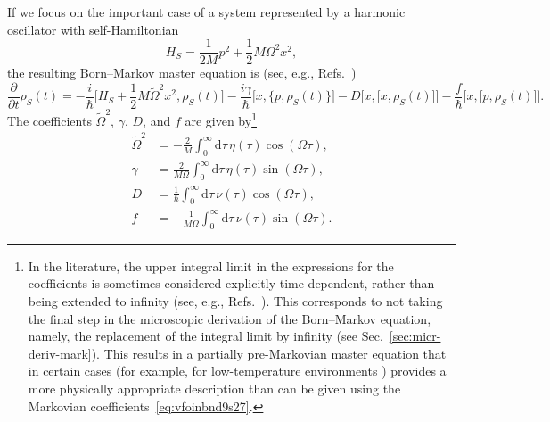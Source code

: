 \documentclass[3p,sort&compress]{elsarticle}
\newcommand{\D}{\ensuremath{\mathrm{d}}}
\newcommand{\I}{\ensuremath{i}}
\newcommand{\op}[1]{#1}
\begin{document}
If we focus on the important case of a system represented by a harmonic oscillator with self-Hamiltonian
%
\begin{equation}
  \label{eq:sfsfsdfy7jaa11}
  \op{H}_S =  \frac{1}{2M}p^2 +
  \frac{1}{2}M\Omega^2x^2,
\end{equation}
%
the resulting Born--Markov master equation is (see, e.g., Refs.~\cite{Breuer:2002:oq,Zurek:2002:ii,Schlosshauer:2007:un})
%
\begin{equation}
\label{eq:vfoinbnd9s27}
  \frac{\partial}{\partial t} \op{\rho}_S(t) 
  = -\frac{\I}{\hbar} \bigl[ \op{H}_S + \frac{1}{2}M
    \widetilde{\Omega}^2 x^2, \op{\rho}_S(t) \bigr]
  - \frac{\I \gamma}{\hbar} \bigl[ x, \bigr\{ p,
      \op{\rho}_S(t) \bigr\} \bigr] 
 - D \bigl[ x, \bigl[ x, \op{\rho}_S(t) \bigr]
\bigr] 
- \frac{f}{\hbar} \bigl[ x, \bigl[ p, \op{\rho}_S(t) \bigr]
\bigr].
\end{equation}
%
The coefficients $\widetilde{\Omega}^2$, $\gamma$, $D$, and $f$ are given by\footnote{In the literature, the upper integral limit in the expressions for the coefficients is sometimes  considered explicitly time-dependent, rather than being extended to infinity (see, e.g., Refs.~\cite{Paz:2001:aa,Zurek:2002:ii}). This corresponds to not taking the final step in the microscopic derivation of the Born--Markov equation, namely, the replacement of the integral limit by infinity (see Sec.~\ref{sec:micr-deriv-mark}). This results in a partially pre-Markovian master equation that in certain cases  (for example, for low-temperature environments \cite{Unruh:1989:rc,Lombardo:2005:ia}) provides a more physically appropriate description than can be given using the Markovian coefficients~\eqref{eq:vfoinbnd9s27}.}
%
\begin{subequations}\label{eq:jcsfr09355378}
\begin{align}
  \widetilde{\Omega}^2 &= - \frac{2}{M} \int_0^\infty \D \tau \,
  \eta(\tau) \cos\left( \Omega \tau \right), \label{eq:caytcs1} \\
  \gamma &= \frac{2}{M\Omega} \int_0^\infty \D \tau \,
  \eta(\tau) \sin\left( \Omega \tau \right), \label{eq:caytcs2} \\
  D &=  \frac{1}{\hbar} \int_0^\infty \D \tau \,
  \nu(\tau) \cos\left( \Omega \tau \right), \label{eq:caytcs3}  \\
  f &= - \frac{1}{M\Omega} \int_0^\infty \D \tau \,
  \nu(\tau) \sin\left( \Omega \tau \right). \label{eq:caytcs4} 
\end{align}
\end{subequations}
% 
\end{document}
